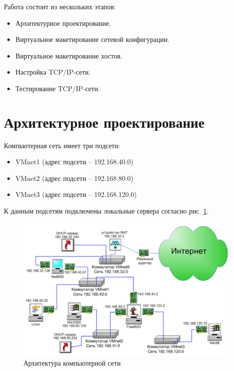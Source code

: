 \documentclass[14pt,a4paper,report]{report}
\begin{document}
Работа состоит из нескольких этапов:

\begin{itemize}
	\item Архитектурное проектирование.
	\item Виртуальное макетирование сетевой конфигурации.
	\item Виртуальное макетирование хостов.
	\item Настройка TCP/IP-сети.
	\item Тестирование TCP/IP-сети.
\end{itemize}

\clearpage

\section{Архитектурное проектирование}

Компьютерная сеть имеет три подсети:

\begin{itemize}
	\item VMnet1 (адрес подсети – 192.168.40.0)
	\item VMnet2 (адрес подсети – 192.168.80.0)
	\item VMnet3 (адрес подсети – 192.168.120.0)
\end{itemize}

К данным подсетям подключены локальные сервера согласно рис. \ref{image:0}.

\begin{figure}[h!]
	\centering
	\includegraphics[scale = 0.8]{images/0.png}
	\caption{Архитектура компьютерной сети}
	\label{image:0}
\end{figure}
\end{document}
